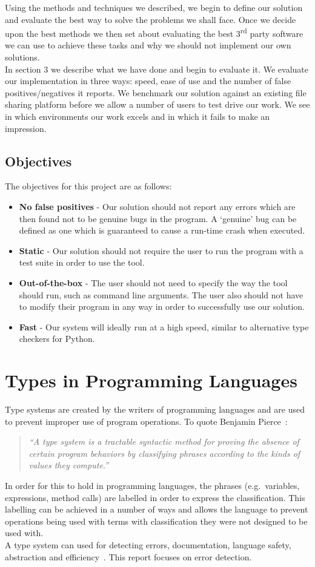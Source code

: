 \documentclass[12pt, titlepage]{article}
\begin{document}
\indent Using the methods and techniques we described, we begin to define our solution and evaluate the best way to solve the problems we shall face. Once we decide upon the best methods we then set about evaluating the best 3\textsuperscript{rd} party software we can use to achieve these tasks and why we should not implement our own solutions. \\
\indent In section 3 we describe what we have done and begin to evaluate it. We evaluate our implementation in three ways: speed, ease of use and the number of false positives/negatives it reports. We benchmark our solution against an existing file sharing platform before we allow a number of users to test drive our work. We see in which environments our work excels and in which it fails to make an impression.

\subsection{Objectives}
The objectives for this project are as follows:
\begin{itemize}
	\item \textbf{No false positives} - Our solution should not report any errors which are then found not to be genuine bugs in the program. A `genuine' bug can be defined as one which is guaranteed to cause a run-time crash when executed.
	\item \textbf{Static} - Our solution should not require the user to run the program with a test suite in order to use the tool.
	\item \textbf{Out-of-the-box} - The user should not need to specify the way the tool should run, such as command line arguments. The user also should not have to modify their program in any way in order to successfully use our solution.
	\item \textbf{Fast} - Our system will ideally run at a high speed, similar to alternative type checkers for Python.
\end{itemize} 

\section{Types in Programming Languages}
Type systems are created by the writers of programming languages and are used to prevent improper use of program operations. To quote Benjamin Pierce~\cite{pierce02}:
\begin{quote}
	\emph{``A type system is a tractable syntactic method for proving the absence of certain program behaviors by classifying phrases according to the kinds of values they compute.''}
\end{quote}
In order for this to hold in programming languages, the phrases (e.g.\ variables, expressions, method calls) are labelled in order to express the classification. This labelling can be achieved in a number of ways and allows the language to prevent operations being used with terms with classification they were not designed to be used with. \\
A type system can used for detecting errors, documentation, language safety, abstraction and efficiency~\cite{pierce02}. This report focuses on error detection.
\end{document}
